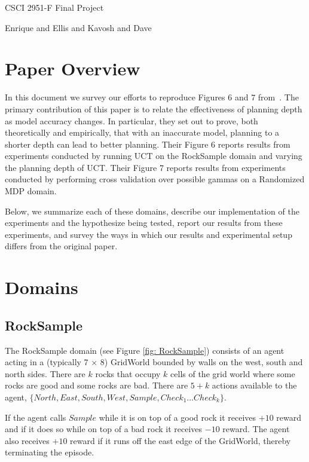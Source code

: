 \documentclass[11pt]{article} %
\begin{document}
\centerline{\LARGE{CSCI 2951-F Final Project}}
\centerline{Enrique and Ellis and Kavosh and Dave}
\vspace{2mm}


\section{Paper Overview}

In this document we survey our efforts to reproduce Figures 6 and 7 from~\cite{jiang2015dependence}. The primary contribution of this paper is to relate the effectiveness of planning depth as model accuracy changes. In particular, they set out to prove, both theoretically and empirically, that with an inaccurate model, planning to a shorter depth can lead to better planning. Their Figure 6 reports results from experiments conducted by running UCT on the RockSample domain and varying the planning depth of UCT. Their Figure 7 reports results from experiments conducted by performing cross validation over possible gammas on a Randomized MDP domain.

Below, we summarize each of these domains, describe our implementation of the experiments and the hypothesize being tested, report our results from these experiments, and survey the ways in which our results and experimental setup differs from the original paper.

\section{Domains}

\subsection{RockSample}
\label{sec: rocksample}
The RockSample domain (see Figure \ref{fig: RockSample}) consists of an agent acting in a (typically 7 $\times$ 8) GridWorld bounded by walls on the west, south and north sides. There are $k$ rocks that occupy $k$ cells of the grid world where some rocks are good and some rocks are bad. There are $5+k$ actions available to the agent, $\{North, East, South, West, Sample, Check_1 \ldots Check_k\}$. 

If the agent calls $Sample$ while it is on top of a good rock it receives $+10$ reward and if it does so while on top of a bad rock it receives $-10$ reward. The agent also receives $+10$ reward if it runs off the east edge of the GridWorld, thereby terminating the episode.
\end{document}

